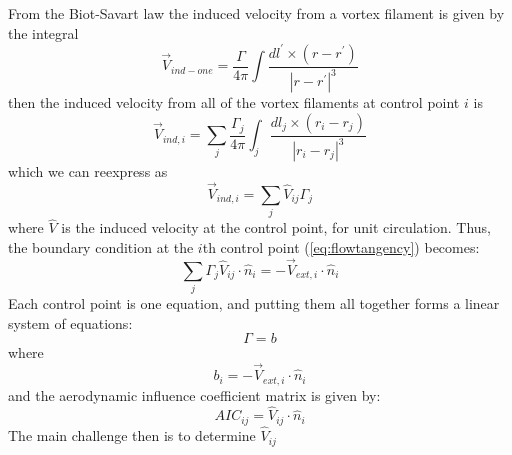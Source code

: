 \documentclass{article}
\begin{document}
From the Biot-Savart law the induced velocity from a vortex filament is given by the integral
\begin{equation}
    \vec{V}_{ind-one} = \frac{\Gamma}{4\pi}\int \frac{dl^\prime \times (r - r^\prime)}{|r - r^\prime|^3}
\end{equation}
then the induced velocity from all of the vortex filaments at control point $i$ is
\begin{equation}
    \vec{V}_{ind, i} = \sum_j \frac{\Gamma_j}{4\pi}\int_j \frac{dl_j \times (r_i - r_j)}{|r_i - r_j|^3}
\end{equation}
which we can reexpress as
\begin{equation}
    \vec{V}_{ind, i} = \sum_j \hat{V}_{ij} \Gamma_j
\end{equation}
where $\hat{V}$ is the induced velocity at the control point, for unit circulation.  Thus, the boundary condition at the $i$th control point (\cref{eq:flowtangency}) becomes:
\begin{equation}
\sum_j \Gamma_j \hat{V}_{ij} \cdot \hat{n}_{i} = - \vec V_{ext,i} \cdot \hat{n}_{i}
\end{equation}
Each control point is one equation, and putting them all together forms a linear system of equations:
\begin{equation}
[AIC] \Gamma = b 
\label{eq:linearsystem}
\end{equation}
where 
\begin{equation}
b_i = - \vec V_{ext, i} \cdot \hat{n}_{i}
\label{eq:rhs}
\end{equation}
and the aerodynamic influence coefficient matrix is given by:
\begin{equation}
AIC_{ij} = \hat{V}_{ij} \cdot \hat{n}_{i}
\end{equation}
The main challenge then is to determine $\hat{V}_{ij}$
\end{document}
